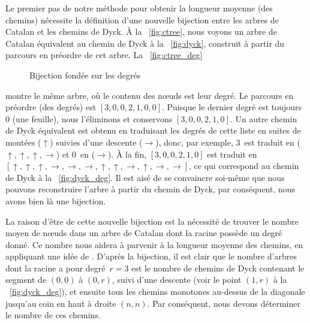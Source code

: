Le premier pas de notre méthode pour obtenir la longueur moyenne (des
chemins) nécessite la définition d'une nouvelle bijection entre les
arbres de Catalan et les chemins de Dyck. À la \fig~\vref{fig:ctree},
nous voyons un arbre de Catalan équivalent au chemin de Dyck à la
\fig~\ref{fig:dyck}, construit à partir du parcours en préordre de cet
arbre. La \fig~\ref{fig:ctree_deg}
\begin{figure}
\centering
{}
\qquad
{}
\caption{Bijection fondée sur les degrés\label{fig:bijection_deg}}
\end{figure}
montre le même arbre, où le contenu des n{\oe}uds est leur degré. Le
parcours en préordre (des degrés) est \([3,0,0,2,1,0,0]\). Puisque le
dernier degré est toujours~\(0\) (une feuille), nous l'éliminons et
conservons \([3,0,0,2,1,0]\). Un autre chemin de Dyck équivalent est
obtenu en traduisant les degrés de cette liste en suites de montées
(\(\uparrow\)) suivies d'une descente (\(\rightarrow\)), donc, par
exemple, \(3\)~est traduit en (\(\uparrow, \uparrow, \uparrow,
\rightarrow\)) et \(0\)~en (\(\rightarrow\)). À la fin,
\([3,0,0,2,1,0]\) est traduit en \([\uparrow, \uparrow, \uparrow,
\rightarrow, \rightarrow, \rightarrow, \uparrow, \uparrow,
\rightarrow, \uparrow, \rightarrow, \rightarrow]\), ce qui correspond
au chemin de Dyck à la \fig~\ref{fig:dyck_deg}. Il est aisé de se
convaincre soi-même que nous pouvons reconstruire l'arbre à partir du
chemin de Dyck, par conséquent, nous avons bien là une bijection.

La raison d'être de cette nouvelle bijection est la nécessité de
trouver le nombre moyen de n{\oe}uds dans un arbre de Catalan dont la
racine possède un degré donné. Ce nombre nous aidera à parvenir à la
longueur moyenne des chemins, en appliquant une idée de
\cite{Ruskey_1983}. D'après la bijection, il est clair que le nombre
d'arbres dont la racine a pour degré~\(r=3\) est le nombre de chemins
de Dyck contenant le segment de \((0,0)\) à \((0,r)\), suivi d'une
descente (voir le point \((1,r)\) à la \fig~\ref{fig:dyck_deg}), et
ensuite tous les chemins monotones au-dessus de la diagonale jusqu'au
coin en haut à droite \((n,n)\).  Par conséquent, nous devons
déterminer le nombre de ces chemins.

